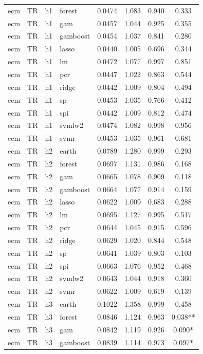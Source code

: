 \begin{ThreePartTable}
\begin{longtable}[t]{llclcccc}
ecm & TR & h1 & forest & 0.0474 & 1.083 & 0.940 & 0.333\\
ecm & TR & h1 & gam & 0.0457 & 1.044 & 0.925 & 0.355\\
ecm & TR & h1 & gamboost & 0.0454 & 1.037 & 0.841 & 0.280\\
ecm & TR & h1 & lasso & 0.0440 & 1.005 & 0.696 & 0.344\\
ecm & TR & h1 & lm & 0.0472 & 1.077 & 0.997 & 0.851\\
ecm & TR & h1 & pcr & 0.0447 & 1.022 & 0.863 & 0.544\\
ecm & TR & h1 & ridge & 0.0442 & 1.009 & 0.804 & 0.494\\
ecm & TR & h1 & sp & 0.0453 & 1.035 & 0.766 & 0.412\\
ecm & TR & h1 & spi & 0.0442 & 1.009 & 0.812 & 0.474\\
ecm & TR & h1 & svmlw2 & 0.0474 & 1.082 & 0.998 & 0.956\\
ecm & TR & h1 & svmr & 0.0453 & 1.035 & 0.961 & 0.681\\
\addlinespace
ecm & TR & h2 & earth & 0.0789 & 1.280 & 0.999 & 0.293\\
ecm & TR & h2 & forest & 0.0697 & 1.131 & 0.986 & 0.168\\
ecm & TR & h2 & gam & 0.0665 & 1.078 & 0.909 & 0.118\\
ecm & TR & h2 & gamboost & 0.0664 & 1.077 & 0.914 & 0.159\\
ecm & TR & h2 & lasso & 0.0622 & 1.009 & 0.683 & 0.288\\
ecm & TR & h2 & lm & 0.0695 & 1.127 & 0.995 & 0.517\\
ecm & TR & h2 & pcr & 0.0644 & 1.045 & 0.915 & 0.596\\
ecm & TR & h2 & ridge & 0.0629 & 1.020 & 0.844 & 0.548\\
ecm & TR & h2 & sp & 0.0641 & 1.039 & 0.803 & 0.103\\
ecm & TR & h2 & spi & 0.0663 & 1.076 & 0.952 & 0.468\\
ecm & TR & h2 & svmlw2 & 0.0643 & 1.044 & 0.918 & 0.360\\
ecm & TR & h2 & svmr & 0.0622 & 1.009 & 0.619 & 0.139\\
\addlinespace
ecm & TR & h3 & earth & 0.1022 & 1.358 & 0.999 & 0.458\\
ecm & TR & h3 & forest & 0.0846 & 1.124 & 0.963 & 0.038**\\
ecm & TR & h3 & gam & 0.0842 & 1.119 & 0.926 & 0.090*\\
ecm & TR & h3 & gamboost & 0.0839 & 1.114 & 0.973 & 0.097*\\

\end{longtable}
\end{ThreePartTable}
